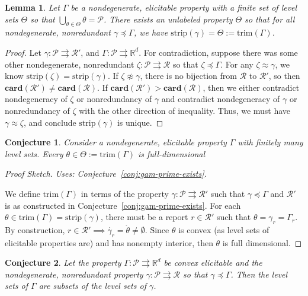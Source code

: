 \documentclass[12pt]{article}
\newcommand{\Comments}{1}
\newcommand{\mynote}[2]{\ifnum\Comments=1\textcolor{#1}{#2}\fi}
\newcommand{\jessie}[1]{\mynote{purple}{[JF: #1]}}
\newcommand{\reals}{\mathbb{R}}
\renewcommand{\P}{\mathcal{P}}
\newcommand{\R}{\mathcal{R}}
\newcommand{\inter}[1]{\mathring{#1}}%
\newcommand{\toto}{\rightrightarrows}
\newcommand{\trim}{\mathrm{trim}}
\newcommand{\strip}{\mathrm{strip}}
\newcommand{\card}{\textbf{card}}
\newtheorem{lemma}{Lemma}
\newtheorem{conjecture}{Conjecture}
\begin{document}
\begin{lemma}\label{lem:define-trim}
	Let $\Gamma$  be a nondegenerate, elicitable property with a finite set of level sets $\Theta$ so that $\bigcup_{\theta \in \Theta} \theta = \P$.
	There exists an unlabeled property $\Theta$ so that for all nondegenerate, nonredundant $\gamma \preceq \Gamma$, we have $\strip(\gamma) = \Theta := \trim(\Gamma)$.
\end{lemma}

\begin{proof}
	Let $\gamma: \P \toto \R'$, and $\Gamma: \P \toto \reals^d$.
	For contradiction, suppose there was some other nondegenerate, nonredundant $\zeta: \P \toto \R$ so that $\zeta \preceq \Gamma$.
	For any $\zeta \approx \gamma$, we know $\strip(\zeta) = \strip(\gamma)$.
	If $\zeta \not \approx \gamma$, there is no bijection from $\R$ to $\R'$, so then $\card(\R') \neq \card(\R)$.
	If $\card(\R') > \card(\R)$, then we either contradict nondegeneracy of $\zeta$ or nonredundancy of $\gamma$ and contradict nondegeneracy of $\gamma$ or nonredundancy of $\zeta$ with the other direction of inequality.
	Thus, we must have $\gamma \approx \zeta$, and conclude $\strip(\gamma)$ is unique.
	
\end{proof}




\begin{conjecture}\label{conj:trim-full-dim}
	Consider a nondegenerate, elicitable property $\Gamma$ with finitely many level sets.
	Every $\theta \in \Theta := \trim(\Gamma)$ is full-dimensional  
\end{conjecture}

\begin{proof}[Proof Sketch]
	\emph{Uses: Conjecture~\ref{conj:gam-prime-exists}.}
	
	We define $\trim(\Gamma)$ in terms of the property $\gamma: \P \toto \R'$ such that $\gamma \preceq \Gamma$ and $\R'$ is as constructed in Conjecture~\ref{conj:gam-prime-exists}.
	For each $\theta \in \trim(\Gamma) = \strip(\gamma)$, there must be a report $r \in \R'$ such that $\theta = \gamma_r = \Gamma_{r}$.
	By construction, $r \in \R' \implies \inter{\gamma_r} = \inter{\theta} \neq \emptyset$.
	Since $\theta$ is convex (as level sets of elicitable properties are) and has nonempty interior, then $\theta$ is full dimensional. 
	
\end{proof}


\begin{conjecture}\label{conj:lev-sets-subsets}
	Let the property $\Gamma: \P \toto \reals^d$ be convex elicitable and the nondegenerate, nonredundant property $\gamma: \P \toto \R$ so that $\gamma \preceq \Gamma$.
	Then the level sets of $\Gamma$ are subsets of the level sets of $\gamma$.
\end{conjecture}
\end{document}
